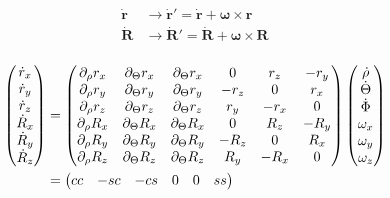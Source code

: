 \documentclass{article}
\begin{document}
\begin{subequations}
\begin{align*}
	\dot{\bm{r}} &\longrightarrow \dot{\bm{r}}' = \dot{\bm{r}} + \bm{\omega} \times \bm{r}\\
	\dot{\bm{R}}& \longrightarrow \dot{\bm{R}}' = \dot{\bm{R}} + \bm{\omega} \times \bm{R}\\
\end{align*}   
\end{subequations} 

\begin{align}
\begin{pmatrix}
       \dot{r}_x \\
       \dot{r}_y \\
       \dot{r}_z \\
       \dot{R}_x \\
       \dot{R}_y \\
       \dot{R}_z\\
 \end{pmatrix} 
 &= 
 \begin{pmatrix*}[c]
       \partial_{\rho} r_x & \partial_{\Theta} r_x & \partial_{\Theta} r_x & 0 & r_z & -r_y\\
       \partial_{\rho} r_y & \partial_{\Theta} r_y & \partial_{\Theta} r_y & -r_z & 0 & r_x\\
       \partial_{\rho} r_z & \partial_{\Theta} r_z & \partial_{\Theta} r_z & r_y & -r_x & 0\\
       \partial_{\rho} R_x & \partial_{\Theta} R_x & \partial_{\Theta} R_x & 0 & R_z & -R_y\\
       \partial_{\rho} R_y & \partial_{\Theta} R_y & \partial_{\Theta} R_y & -R_z & 0 & R_x\\
       \partial_{\rho} R_z & \partial_{\Theta} R_z & \partial_{\Theta} R_z & R_y & -R_x & 0\\
     \end{pmatrix*}
     \begin{pmatrix}
     \dot{\rho}\\
     \dot{\Theta}\\
     \dot{\Phi}\\
     \omega_x\\
     \omega_y\\
     \omega_z\\
     \end{pmatrix} \notag \\
     &=
     \begin{pmatrix*}[c]
       cc & -sc & -cs & 0 & 0 & ss\\

\end{pmatrix*}
\end{align}
\end{document}
